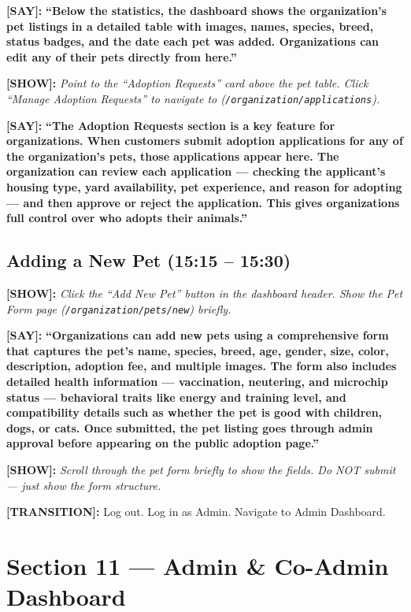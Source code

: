 \documentclass[12pt,a4paper]{article}
\newcommand{\say}[1]{\textbf{\textcolor{narration}{[SAY]:}} \textbf{``#1''}}
\newcommand{\show}[1]{\textbf{\textcolor{screen}{[SHOW]:}} \textit{#1}}
\newcommand{\trans}[1]{\textbf{\textcolor{transition}{[TRANSITION]:}} #1}
\begin{document}
\say{Below the statistics, the dashboard shows the organization's pet listings in a detailed table with images, names, species, breed, status badges, and the date each pet was added. Organizations can edit any of their pets directly from here.}

\show{Point to the ``Adoption Requests'' card above the pet table. Click ``Manage Adoption Requests'' to navigate to (\texttt{/organization/applications}).}

\say{The Adoption Requests section is a key feature for organizations. When customers submit adoption applications for any of the organization's pets, those applications appear here. The organization can review each application --- checking the applicant's housing type, yard availability, pet experience, and reason for adopting --- and then approve or reject the application. This gives organizations full control over who adopts their animals.}

\subsection{Adding a New Pet (15:15 -- 15:30)}

\show{Click the ``Add New Pet'' button in the dashboard header. Show the Pet Form page (\texttt{/organization/pets/new}) briefly.}

\say{Organizations can add new pets using a comprehensive form that captures the pet's name, species, breed, age, gender, size, color, description, adoption fee, and multiple images. The form also includes detailed health information --- vaccination, neutering, and microchip status --- behavioral traits like energy and training level, and compatibility details such as whether the pet is good with children, dogs, or cats. Once submitted, the pet listing goes through admin approval before appearing on the public adoption page.}

\show{Scroll through the pet form briefly to show the fields. Do NOT submit --- just show the form structure.}

\trans{Log out. Log in as Admin. Navigate to Admin Dashboard.}

\newpage

\section{Section 11 --- Admin \& Co-Admin Dashboard}
\label{sec:admin}
\end{document}
